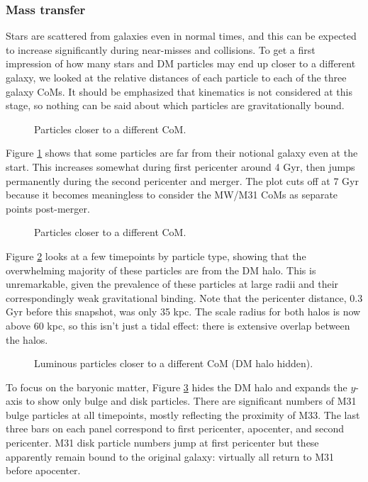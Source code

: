 \documentclass[twocolumn]{aastex63}
\begin{document}
\subsubsection{Mass transfer}

Stars are scattered from galaxies even in normal times, and this can be expected to increase significantly during near-misses and collisions. To get a first impression of how many stars and DM particles may end up closer to a different galaxy, we looked at the relative distances of each particle to each of the three galaxy CoMs. It should be emphasized that kinematics is not considered at this stage, so nothing can be said about which particles are gravitationally bound.

\begin{figure}[htb!]
	\caption{Particles closer to a different CoM.
		\label{fig:trans_count}}
\end{figure}

Figure \ref{fig:trans_count} shows that some particles are far from their notional galaxy even at the start. This increases somewhat during first pericenter around 4 Gyr, then jumps permanently during the second pericenter and merger. The plot cuts off at 7 Gyr because it becomes meaningless to consider the MW/M31 CoMs as separate points post-merger.

\begin{figure}[htb!]
	\caption{Particles closer to a different CoM.
		\label{fig:trans_p}}
\end{figure}

Figure \ref{fig:trans_p} looks at a few timepoints by particle type, showing that the overwhelming majority of these particles are from the DM halo. This is unremarkable, given the prevalence of these particles at large radii and their correspondingly weak gravitational binding. Note that the pericenter distance, 0.3 Gyr before this snapshot, was only 35 kpc. The scale radius for both halos is now above 60 kpc, so this isn't just a tidal effect: there is extensive overlap between the halos.

\begin{figure}[htb!]
	\caption{Luminous particles closer to a different CoM (DM halo hidden).
		\label{fig:trans_l}}
\end{figure}

To focus on the baryonic matter, Figure \ref{fig:trans_l} hides the DM halo and expands the $y$-axis to show only bulge and disk particles. There are significant numbers of M31 bulge particles at all timepoints, mostly reflecting the proximity of M33. The last three bars on each panel correspond to first pericenter, apocenter, and second pericenter. M31 disk particle numbers jump at first pericenter but these apparently remain bound to the original galaxy: virtually all return to M31 before apocenter.
\end{document}
